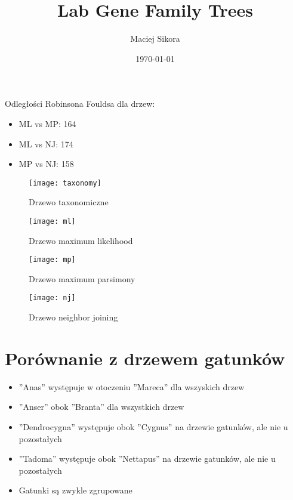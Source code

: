 \documentclass[12pt]{article}
\title{Lab Gene Family Trees}
\author{Maciej Sikora}
\date{\specialdate\today}
\begin{document}
\maketitle
Odległości Robinsona Fouldsa dla drzew:
\begin{itemize}
\item ML vs MP: 164
\item ML vs NJ: 174
\item MP vs NJ: 158
\end{itemize}

\begin{figure}[H]
\begin{center}
\texttt{[image: taxonomy]}
\caption{Drzewo taxonomiczne}
\end{center}
\end{figure}

\begin{figure}[H]
\begin{center}
\texttt{[image: ml]}
\caption{Drzewo maximum likelihood}
\end{center}
\end{figure}

\begin{figure}[H]
\begin{center}
\texttt{[image: mp]}
\caption{Drzewo maximum parsimony}
\end{center}
\end{figure}

\begin{figure}[H]
\begin{center}
\texttt{[image: nj]}
\caption{Drzewo neighbor joining}
\end{center}
\end{figure}

\section{Porównanie z drzewem gatunków}
\begin{itemize}
\item ''Anas'' występuje w otoczeniu ''Mareca'' dla wszyskich drzew
\item ''Anser'' obok ''Branta'' dla wszystkich drzew
\item ''Dendrocygna'' występuje obok ''Cygnus'' na drzewie gatunków, ale nie u pozostałych
\item ''Tadoma'' występuje obok ''Nettapus'' na drzewie gatunków, ale nie u pozostałych
\item Gatunki są zwykle zgrupowane
\end{itemize}
\end{document}
